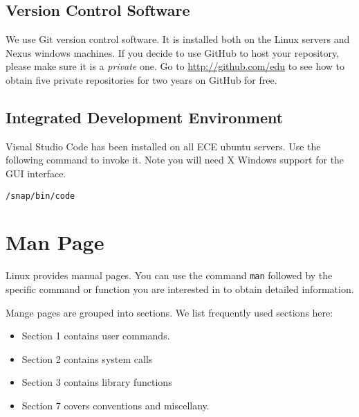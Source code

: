 \subsection{Version Control Software}
We use Git version control software. It is installed both on the Linux servers and Nexus windows machines. If you decide to use GitHub to host your repository, please make sure it is a {\em private} one. Go to \url{http://github.com/edu} to see how to obtain five private repositories for two years on GitHub for free. 


\subsection{Integrated Development Environment}
Visual Studio Code has been installed on all ECE ubuntu servers. Use the following command to invoke it. Note you will need X Windows support for the GUI interface.
\begin{lstlisting}[style=bash]
/snap/bin/code
\end{lstlisting}
\iffalse
Eclipse with C/C++ Plug-in has been installed on all ECE Linux servers. Type the following command to bring up the eclipse frontend.
\begin{lstlisting}[style=bash]
/opt/eclipse64/eclipse
\end{lstlisting}
This eclipse is not the same as the default eclipse under \verb+/usr/bin+ directory. You may find running eclipse over network performs poorly at home though. It depends on how fast your network speed is. 

If you have Linux operating system installed on your own personal computer, then you can download the eclipse with C/C++ plugin from the eclipse web site and then run it from your own local computer. However you should always make sure the program will also work on ecelinux machines, which is the environment TAs would be using to test your code.
\fi
\section{Man Page}
Linux provides manual pages. You can use the command \verb+man+ followed by the specific command or function you are interested in to obtain detailed information. 

Mange pages are grouped into sections. We list frequently used sections here: 
\begin{itemize}
\item Section 1 contains user commands.
\item Section 2 contains system calls
\item Section 3 contains library functions
\item Section 7 covers conventions and miscellany. 
\end{itemize}

